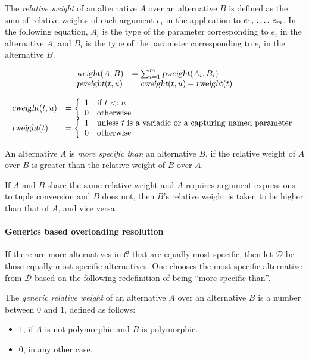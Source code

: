 \begin{definition}
The {\em relative weight} of an alternative $A$ over an alternative $B$ is defined as the sum of relative weights of each argument $e_i$ in the application to $e_1 ,\, \ldots ,\, e_m$. In the following equation, $A_i$ is the type of the parameter corresponding to $e_i$ in the alternative $A$, and $B_i$ is the type of the parameter corresponding to $e_i$ in the alternative $B$. 

\[\begin{array}{l l}
\mbox{\sl weight}(A, B) &= \sum_{i=1}^{m} \mbox{\sl pweight}(A_i, B_i) \\
\mbox{\sl pweight}(t, u) &= \mbox{\sl cweight}(t, u) + \mbox{\sl rweight}(t)
\end{array}
\]

\[\begin{array}{l l}
\mbox{\sl cweight}(t, u) &= \left\{ 
  \begin{array}{l l}
    1 & \textrm{if $t <: u$}\\
    0 & \textrm{otherwise}
  \end{array} \right. \\
\mbox{\sl rweight}(t) &= \left\{ 
  \begin{array}{l l}
    1 & \textrm{unless $t$ is a variadic or a capturing named parameter}\\
    0 & \textrm{otherwise}
  \end{array} \right.
\end{array}\]
\end{definition}

An alternative $A$ is {\em more specific than} an alternative $B$, if the relative weight of $A$ over $B$ is greater than the relative weight of $B$ over $A$. 

If $A$ and $B$ share the same relative weight and $A$ requires argument expressions to tuple conversion and $B$ does not, then $B$'s relative weight is taken to be higher than that of $A$, and vice versa. 

\paragraph{Generics based overloading resolution}
If there are more alternatives in $\mathcal{C}$ that are equally most specific, then let $\mathcal{D}$ be those equally most specific alternatives. One chooses the most specific alternative from $\mathcal{D}$ based on the following redefinition of being ``more specific than''. 

\begin{definition}
The {\em generic relative weight} of an alternative $A$ over an alternative $B$ is a number between $0$ and $1$, defined as follows:
\begin{itemize}
  \item $1$, if $A$ is not polymorphic and $B$ is polymorphic. 
  \item $0$, in any other case. 
\end{itemize}
\end{definition}

